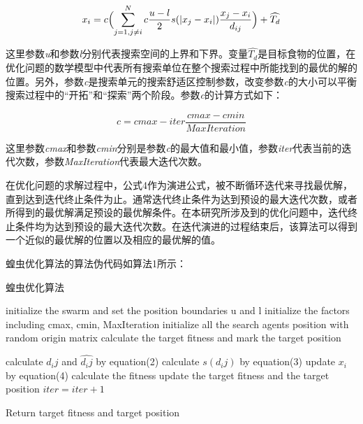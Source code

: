 \begin{equation}
    x_i = c \Bigl(\sum_{j=1,j\neq{i}}^N c \frac{u-l}{2}s (\lvert x_j-x_i \rvert )\frac{x_j-x_i}{d_{ij}} \Bigr) + \widehat{T_d}
\end{equation}

这里参数\emph{u}和参数\emph{l}分别代表搜索空间的上界和下界。变量$\widehat{T_d}$是目标食物的位置，在优化问题的数学模型中代表所有搜索单位在整个搜索过程中所能找到的最优的解的位置。另外，参数\emph{c}是搜索单元的搜索舒适区控制参数，改变参数\emph{c}的大小可以平衡搜索过程中的“开拓”和“探索”两个阶段。参数\emph{c}的计算方式如下：

\begin{equation}
    c = cmax - iter \frac{cmax - cmin}{MaxIteration}
\end{equation}


这里参数\emph{cmax}和参数\emph{cmin}分别是参数\emph{c}的最大值和最小值，参数\emph{iter}代表当前的迭代次数，参数\emph{MaxIteration}代表最大迭代次数。

在优化问题的求解过程中，公式4作为演进公式，被不断循环迭代来寻找最优解，直到达到迭代终止条件为止。通常迭代终止条件为达到预设的最大迭代次数，或者所得到的最优解满足预设的最优解条件。在本研究所涉及到的优化问题中，迭代终止条件均为达到预设的最大迭代次数。在迭代演进的过程结束后，该算法可以得到一个近似的最优解的位置以及相应的最优解的值。

蝗虫优化算法的算法伪代码如算法1所示：
\begin{algorithm}

    \caption{蝗虫优化算法}
    \label{alg:GOA}
    
    \begin{algorithmic}[1]
    \State initialize the swarm and set the position boundaries u and l
    \State initialize the factors including cmax, cmin, MaxIteration
    \State initialize all the search agents position with random origin matrix 
    \State calculate the target fitness and mark the target position
    
    \State calculate $d_ij$ and $\widehat{d_ij}$ by equation(2)
    \State calculate $s(d_ij)$ by equation(3)
    \State update $x_i$ by equation(4)
    \State calculate the fitness 
        \State update the target fitness and the target position
    \EndIf
    \State $iter = iter +1$
     
    \EndWhile

    \State Return target fitness and target position
    
    
    \end{algorithmic}
    
\end{algorithm}

